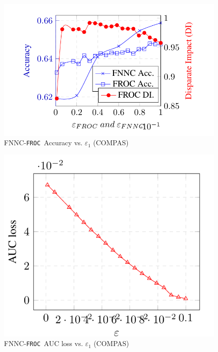 \documentclass{article}
\newcommand{\ouralgo}{\texttt{FROC}}
\begin{document}
\begin{figure}[!h]
    \centering
    \includegraphics[width=1\linewidth]{Images/FNNC_COMPAS_Acc_DI.png}
    \caption{FNNC-\ouralgo\  Accuracy vs. $\varepsilon_1$ (COMPAS)}
    \label{fig:FNNC_COMPAS_Accuracy}
\end{figure}


\begin{figure}[!h]
    \centering
    \includegraphics[width=1\linewidth]{Images/FNNC_COMPAS_AUC.png}
    \caption{FNNC-\ouralgo\ AUC loss vs. $\varepsilon_1$ (COMPAS)}
    \label{fig:FNNC_COMPAS_AUC}
\end{figure}
\end{document}
